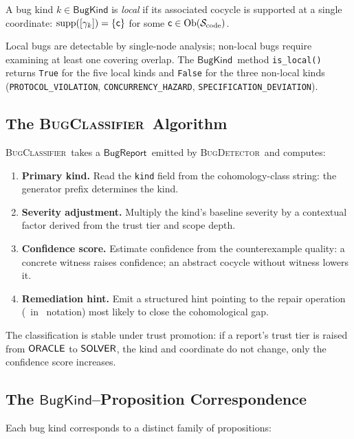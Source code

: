\documentclass[11pt]{article}
\newcommand{\BugKind}{\ensuremath{\mathsf{BugKind}}}          %
\newcommand{\BugRep}{\ensuremath{\mathsf{BugReport}}}          %
\newcommand{\BugDet}{\textsc{BugDetector}}        %
\newcommand{\BugClass}{\textsc{BugClassifier}}    %
\newcommand{\SemSite}{\mathcal{S}_{\mathrm{code}}}%
\begin{document}
\begin{definition}\label{def:local-bug}
A bug kind $k \in \BugKind$ is \emph{local} if its associated cocycle is
supported at a single coordinate:
$\mathrm{supp}([\gamma_k]) = \{\mathsf{c}\}$ for some $\coord \in \Ob(\SemSite)$.
\end{definition}

Local bugs are detectable by single-node analysis; non-local bugs require
examining at least one covering overlap.  The \BugKind\ method
\texttt{is\_local()} returns \texttt{True} for the five local kinds
and \texttt{False} for the three non-local kinds
(\texttt{PROTOCOL\_VIOLATION}, \texttt{CONCURRENCY\_HAZARD},
\texttt{SPECIFICATION\_DEVIATION}).

\subsection{The \BugClass\ Algorithm}

\BugClass\ takes a \BugRep\ emitted by \BugDet\ and computes:
\begin{enumerate}[leftmargin=2em,label=(\roman*)]
\item \textbf{Primary kind.}  Read the \texttt{kind} field from the
  cohomology-class string: the generator prefix determines the kind.
\item \textbf{Severity adjustment.}  Multiply the kind's baseline severity
  by a contextual factor derived from the trust tier and scope depth.
\item \textbf{Confidence score.}  Estimate confidence from the
  counterexample quality: a concrete witness raises confidence; an
  abstract cocycle without witness lowers it.
\item \textbf{Remediation hint.}  Emit a structured hint pointing to the
  repair operation (\REPAIR\ in \JuGeo\ notation) most likely to close the
  cohomological gap.
\end{enumerate}

The classification is stable under trust promotion: if a report's trust
tier is raised from $\mathsf{ORACLE}$ to $\mathsf{SOLVER}$, the kind and coordinate do
not change, only the confidence score increases.

\subsection{The \BugKind--Proposition Correspondence}

Each bug kind corresponds to a distinct family of propositions:
\end{document}
